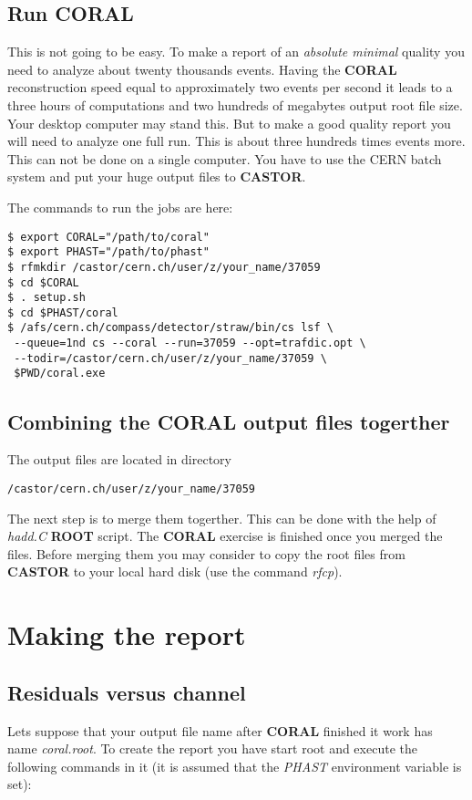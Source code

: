 \documentclass[a4paper,12pt]{article}
\begin{document}
\begin{enumerate}
\subsection{Run CORAL}
This is not going to be easy. To make a report of an {\it absolute minimal} quality you
need to analyze about twenty thousands events. Having the {\bf CORAL} reconstruction
speed equal to approximately two events per second it leads to a three hours of
computations and two hundreds of megabytes output root file size. Your desktop computer
may stand this. But to make a good quality report
you will need to analyze one full run. This is about three hundreds times events
more. This can not be done on a single computer. You
have to use the CERN batch system and put your huge output files to {\bf CASTOR}.

The commands to run the jobs are here:
\begin{verbatim}
$ export CORAL="/path/to/coral"
$ export PHAST="/path/to/phast"
$ rfmkdir /castor/cern.ch/user/z/your_name/37059
$ cd $CORAL
$ . setup.sh
$ cd $PHAST/coral
$ /afs/cern.ch/compass/detector/straw/bin/cs lsf \
 --queue=1nd cs --coral --run=37059 --opt=trafdic.opt \
 --todir=/castor/cern.ch/user/z/your_name/37059 \
 $PWD/coral.exe
\end{verbatim}

\subsection{Combining the CORAL output files togerther}
\label{CORAL-merge}
The output files are located in directory
\begin{verbatim}
/castor/cern.ch/user/z/your_name/37059
\end{verbatim}
The next step is to merge them togerther. This can be done with the help of
{\it hadd.C} {\bf ROOT} script. The {\bf CORAL} exercise is finished once you merged the
files. Before merging them you may consider to copy the root files from {\bf CASTOR} to
your local hard disk (use the command {\it rfcp}).



\section{Making the report}
\subsection{Residuals versus channel}
Lets suppose that your output file name after {\bf CORAL} finished it work
has name {\it coral.root}. To create the report you have start root
and execute the following commands in it (it is assumed that the {\it PHAST}
environment variable is set):


\end{enumerate}
\end{document}
